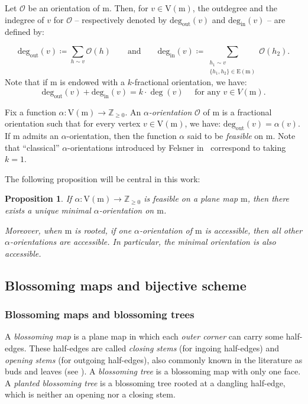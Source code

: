 \documentclass[11pt,reqno,tbtags]{amsart}
\renewcommand{\rm}{\mathrm{m}}
\newtheorem{prop}[theo]{Proposition}
\numberwithin{equation}{section}
\numberwithin{theo}{section}
\theoremstyle{definition}
\newcommand{\cO}{\mathcal{O}}
\newcommand{\out}{\mathrm{deg_{out}}}
\newcommand{\ind}{\mathrm{deg_{in}}}
\begin{document}
Let $\cO$ be an orientation of $\rm$. Then, for $v\in \mathrm{V}(\rm)$, the outdegree and the indegree of $v$ for $\cO$ -- respectively denoted by $\out(v)$ and $\ind(v)$ -- are defined by: 

\begin{equation*}
	\out(v)\coloneqq\sum_{h\sim v}\cO(h)\qquad \text{and} \qquad \ind(v)\coloneqq\sum_{\substack{h_1\sim v\\ \{h_1,h_2\}\in \mathrm{E}(\rm)}}\cO(h_2).
\end{equation*}
Note that if $\rm$ is endowed with a $k$-fractional orientation, we have: 
\[
\out(v)+\ind(v)=k\cdot\deg(v) \quad \text{ for any }v\in V(\rm).
\]


Fix a function $\alpha:\mathrm{V}(\rm)\rightarrow \mathbb{Z}_{\geq 0}$. An \emph{$\alpha$-orientation} $\cO$ of $\rm$ is a fractional orientation such that for every vertex  $v\in \mathrm{V}(\rm)$, we have: $\out(v)=\alpha(v)$. If $\rm$ admits an $\alpha$-orientation, then the function $\alpha$ said to be \emph{feasible} on $\rm$. Note that ``classical'' $\alpha$-orientations introduced by Felsner in~\cite{Felsner04} correspond to taking $k=1$.

The following proposition will be central in this work:
\begin{prop}\cite{Felsner04,BernardiFusy_Girth}\label{prop: Unique minimal orientation}
If $\alpha:\mathrm{V}(\rm)\rightarrow \mathbb{Z}_{\geq 0}$ is feasible on a plane map $\rm$, then there exists a unique minimal $\alpha$-orientation on $\rm$.

Moreover, when $\rm$ is rooted, if one $\alpha$-orientation of $\rm$ is accessible, then all other $\alpha$-orientations are accessible. In particular, the minimal orientation is also accessible.
\end{prop}



	\subsection{Blossoming maps and bijective scheme}
		\subsubsection{Blossoming maps and blossoming trees}

A \emph{blossoming map} is a plane map in which each \emph{outer corner} can carry some half-edges. These half-edges are called \emph{closing stems} (for ingoing half-edges) and \emph{opening stems} (for outgoing half-edges), also commonly known in the literature as buds and leaves (see \cite{BousquetMelouSchaeffer_Bipartite,BouttierDiFrancescoGuitter_Census}). A \emph{blossoming tree} is a blossoming map with only one face. A \emph{planted blossoming tree} is a blossoming tree rooted at a dangling half-edge, which is neither an opening nor a closing stem.
\end{document}
